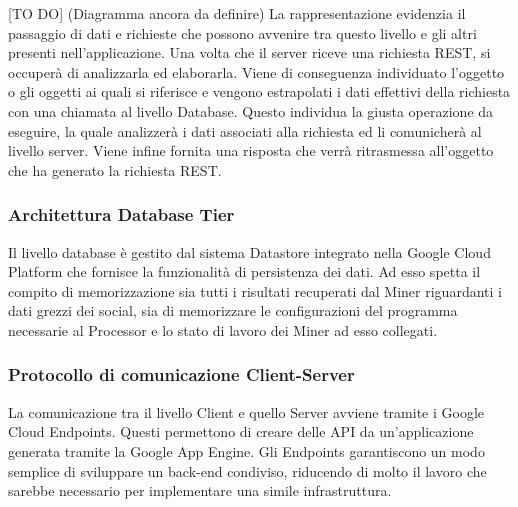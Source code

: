 		[TO DO] (Diagramma ancora da definire) \newline \newline
		[TO REVIEW] \newline
		La rappresentazione evidenzia il passaggio di dati e richieste che possono avvenire tra questo livello e gli altri presenti nell'applicazione.
		Una volta che il server riceve una richiesta REST, si occuperà di analizzarla ed elaborarla. Viene di conseguenza individuato l’oggetto o gli oggetti ai quali si riferisce e vengono estrapolati i dati effettivi della richiesta con una chiamata al livello Database. Questo individua la giusta operazione da eseguire, la quale analizzerà i dati associati alla richiesta ed li comunicherà al livello server. Viene infine fornita una risposta che verrà ritrasmessa all'oggetto che ha generato la richiesta REST.

		\subsubsection{Architettura Database Tier}
		Il livello database è gestito dal sistema Datastore integrato nella Google Cloud Platform che fornisce la funzionalità di persistenza dei dati. Ad esso spetta il compito di memorizzazione sia tutti i risultati recuperati dal Miner riguardanti i dati grezzi dei social, sia di memorizzare le configurazioni del programma necessarie al Processor e lo stato di lavoro dei Miner ad esso collegati.

		\subsubsection{Protocollo di comunicazione Client-Server}
		La comunicazione tra il livello Client e quello Server avviene tramite i Google Cloud Endpoints. Questi permettono di creare delle API da un'applicazione generata tramite la Google App Engine. Gli Endpoints garantiscono un modo semplice di sviluppare un back-end condiviso, riducendo di molto il lavoro che sarebbe necessario per implementare una simile infrastruttura. 

